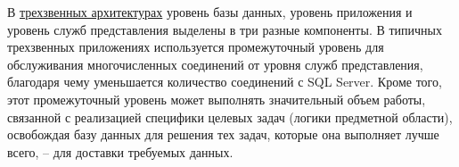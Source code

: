 \bigskip
В \href{https://intuit.ru/studies/courses/68/68/lecture/1990?page=5#:~:text=%D0%A2%D1%80%D0%B5%D1%85%D0%B7%D0%B2%D0%B5%D0%BD%D0%BD%D0%B0%D1%8F%20%D0%B0%D1%80%D1%85%D0%B8%D1%82%D0%B5%D0%BA%D1%82%D1%83%D1%80%D0%B0}{трехзвенных архитектурах} уровень базы данных, уровень приложения и уровень служб представления выделены в три разные компоненты. В типичных трехзвенных приложениях используется промежуточный уровень для обслуживания многочисленных соединений от уровня служб представления, благодаря чему уменьшается количество соединений с SQL Server. Кроме того, этот промежуточный уровень может выполнять значительный объем работы, связанной с реализацией специфики целевых задач (логики предметной области), освобождая базу данных для решения тех задач, которые она выполняет лучше всего, – для доставки требуемых данных.